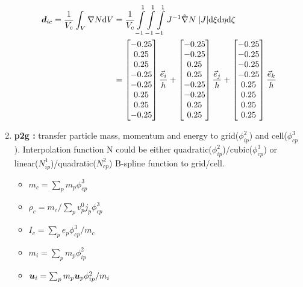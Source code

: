 \documentclass[11pt]{article}
\def\bbf#1{\mathchoice{\hbox{\boldmath$\displaystyle#1$}}
{\hbox{\boldmath$\textstyle#1$}} {\hbox{\boldmath$\scriptstyle#1$}} {\hbox{\boldmath$\scriptscriptstyle#1$}} }
\renewcommand{\mp}{m_{p}}
\newcommand{\pcp}{\phi_{cp}^3}
\newcommand{\pip}{\phi_{ip}^2}
\newcommand{\ui}{\bbf{u}_i}
\newcommand{\up}{\bbf{u}_p}
\newcommand{\ep}{e_p}
\newcommand{\mi}{m_i}
\renewcommand{\mp}{m_p}
\newcommand{\rhoc}{\rho_c}
\newcommand{\Vc}{V_c}
\newcommand{\ic}{I_c}
\newcommand{\dic}{\bbf{d}_{ic}}
\newcommand{\md}{\mbox{d}}
\newcommand{\Int}{\int\limits}
\begin{document}
\begin{enumerate}
    \begin{align*}
    \dic = \frac{1}{\Vc}\int_V \nabla N \md V
    &= \frac{1}{\Vc} \Int_{-1}^{1}\Int_{-1}^{1}\Int_{-1}^{1} J^{-1} \tilde{\nabla} N\;  |J|\md \xi \md \eta \md \zeta \\
    &= \left[
    \begin{array}{@{}c@{}}
    -0.25 \\
    0.25 \\
    0.25 \\
    -0.25 \\
    -0.25 \\
    0.25 \\
    0.25 \\
    -0.25
    \end{array}
    \right] \frac{\vec e_i}{h}
    +\left[
    \begin{array}{@{}c@{}}
    -0.25 \\
    -0.25 \\
    0.25 \\
    0.25 \\
    -0.25 \\
    -0.25 \\
    0.25 \\
    0.25
    \end{array}
    \right] \frac{\vec e_j}{h}
    +\left[
    \begin{array}{@{}c@{}}
    -0.25 \\
    -0.25 \\
    -0.25 \\
    -0.25 \\
    0.25 \\
    0.25 \\
    0.25 \\
    0.25
    \end{array}
    \right] \frac{\vec e_k}{h}
    \end{align*}




\item {\bf p2g :} transfer particle mass, momentum and energy to grid($\pip$) and cell($\pcp$). Interpolation function N could be either quadratic($\pip$)/cubic($\pcp$) or linear($N_{ip}^1$)/quadratic($N_{cp}^2$) B-spline function to grid/cell.
  \begin{itemize}
    \item $m_c = \sum_p \mp \pcp$
    \item $\rhoc = m_c / \sum_p v_p^0 j_p \pcp$
    \item $\ic = \sum_p \ep \pcp / m_c$
    \item $\mi = \sum_p \mp \pip$
    \item $\ui = \sum_p \mp \up \pip / \mi$
\end{itemize}


\end{enumerate}
\end{document}
